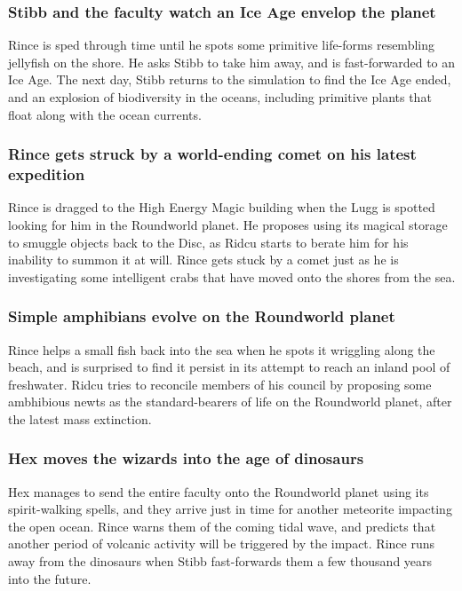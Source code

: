 \subsubsection{\Gls{Stibb} and the faculty watch an Ice Age envelop the planet}
\Gls{Rince} is sped through time until he spots some primitive life-forms resembling jellyfish
on the shore. He asks \Gls{Stibb} to take him away, and is fast-forwarded to an Ice Age. The next
day, \Gls{Stibb} returns to the simulation to find the Ice Age ended, and an explosion of
biodiversity in the oceans, including primitive plants that float along with the ocean currents.

\subsubsection{\Gls{Rince} gets struck by a world-ending comet on his latest expedition}
\Gls{Rince} is dragged to the High Energy Magic building when the \Gls{Lugg} is spotted looking
for him in the Roundworld planet. He proposes using its magical storage to smuggle objects back
to the Disc, as \Gls{Ridcu} starts to berate him for his inability to summon it at will. \Gls{Rince}
gets stuck by a comet just as he is investigating some intelligent crabs that have moved onto the
shores from the sea.

\subsubsection{Simple amphibians evolve on the Roundworld planet}
\Gls{Rince} helps a small fish back into the sea when he spots it wriggling along the beach, and
is surprised to find it persist in its attempt to reach an inland pool of freshwater. \Gls{Ridcu}
tries to reconcile members of his council by proposing some ambhibious newts as the standard-bearers
of life on the Roundworld planet, after the latest mass extinction.

\subsubsection{\Gls{Hex} moves the wizards into the age of dinosaurs}
\Gls{Hex} manages to send the entire faculty onto the Roundworld planet using its spirit-walking
spells, and they arrive just in time for another meteorite impacting the open ocean. \Gls{Rince}
warns them of the coming tidal wave, and predicts that another period of volcanic activity will
be triggered by the impact. \Gls{Rince} runs away from the dinosaurs when \Gls{Stibb} fast-forwards
them a few thousand years into the future.

